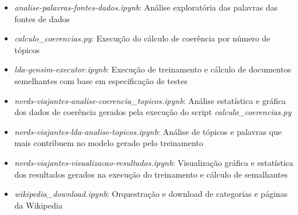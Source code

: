 \begin{itemize}
    \item \textit{analise-palavras-fontes-dados.ipynb}: Análise exploratória das palavras das fontes de dados
    \item \textit{calculo\_coerencias.py}: Execução do cálculo de coerência por número de tópicos
    \item \textit{lda-gensim-executor.ipynb}: Execução de treinamento e cálculo de documentos semelhantes com base em especificação de testes
    \item \textit{nerds-viajantes-analise-coerencia\_topicos.ipynb}: Análise estatística e gráfica dos dados de coerência gerados pela execução do script \textit{calculo\_coerencias.py}
    \item \textit{nerds-viajantes-lda-analise-topicos.ipynb}: Análise de tópicos e palavras que mais contribuem no modelo gerado pelo treinamento
    \item \textit{nerds-viajantes-visualizacao-resultados.ipynb}: Visualização gráfica e estatística dos resultados gerados na execução do treinamento e cálculo de semalhantes
    \item \textit{wikipedia\_download.ipynb}: Orquestração e download de categorias e páginas da Wikipedia
\end{itemize}